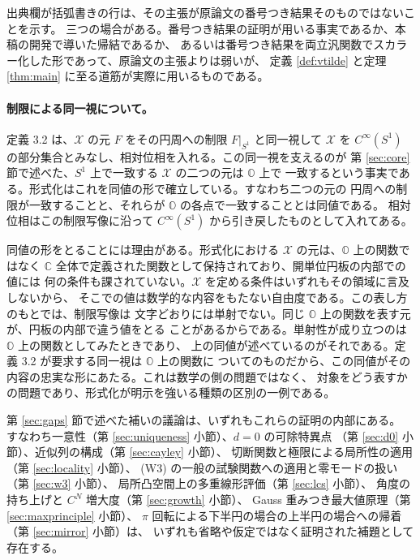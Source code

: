 \documentclass[11pt,a4paper]{article}
\newcommand{\Circ}{S^{1}}
\newcommand{\Xcl}{\mathcal{X}}
\newcommand{\Oex}{\mathbb{O}}
\theoremstyle{definition}
\begin{document}
出典欄が括弧書きの行は、その主張が原論文の番号つき結果そのものではないことを示す。
三つの場合がある。番号つき結果の証明が用いる事実であるか、本稿の開発で導いた帰結であるか、
あるいは番号つき結果を両立汎関数でスカラー化した形であって、原論文の主張よりは弱いが、
定義 \ref{def:vtilde} と定理 \ref{thm:main} に至る道筋が実際に用いるものである。

\paragraph{制限による同一視について。}
\cite{T26} 定義 3.2 は、$\Xcl$ の元 $F$ をその円周への制限 $F|_{\Circ}$ と同一視して
$\Xcl$ を $C^\infty(\Circ)$ の部分集合とみなし、相対位相を入れる。この同一視を支えるのが
第 \ref{sec:core} 節で述べた、$\Circ$ 上で一致する $\Xcl$ の二つの元は $\Oex$ 上で
一致するという事実である。形式化はこれを同値の形で確立している。すなわち二つの元の
円周への制限が一致することと、それらが $\Oex$ の各点で一致することとは同値である。
相対位相はこの制限写像に沿って $C^\infty(\Circ)$ から引き戻したものとして入れてある。

同値の形をとることには理由がある。形式化における $\Xcl$ の元は、$\Oex$ 上の関数ではなく
$\mathbb{C}$ 全体で定義された関数として保持されており、開単位円板の内部での値には
何の条件も課されていない。$\Xcl$ を定める条件はいずれもその領域に言及しないから、
そこでの値は数学的な内容をもたない自由度である。この表し方のもとでは、制限写像は
文字どおりには単射でない。同じ $\Oex$ 上の関数を表す元が、円板の内部で違う値をとる
ことがあるからである。単射性が成り立つのは $\Oex$ 上の関数としてみたときであり、
上の同値が述べているのがそれである。定義 3.2 が要求する同一視は $\Oex$ 上の関数に
ついてのものだから、この同値がその内容の忠実な形にあたる。これは数学の側の問題ではなく、
対象をどう表すかの問題であり、形式化が明示を強いる種類の区別の一例である。

第 \ref{sec:gaps} 節で述べた補いの議論は、いずれもこれらの証明の内部にある。
すなわち一意性（第 \ref{sec:uniqueness} 小節）、$d = 0$ の可除特異点
（第 \ref{sec:d0} 小節）、近似列の構成（第 \ref{sec:cayley} 小節）、
切断関数と極限による局所性の適用（第 \ref{sec:locality} 小節）、
(W3) の一般の試験関数への適用と零モードの扱い（第 \ref{sec:w3} 小節）、
局所凸空間上の多重線形評価（第 \ref{sec:lcs} 小節）、
角度の持ち上げと $C^N$ 増大度（第 \ref{sec:growth} 小節）、
Gauss 重みつき最大値原理（第 \ref{sec:maxprinciple} 小節）、
$\pi$ 回転による下半円の場合の上半円の場合への帰着（第 \ref{sec:mirror} 小節）は、
いずれも省略や仮定ではなく証明された補題として存在する。
\end{document}
